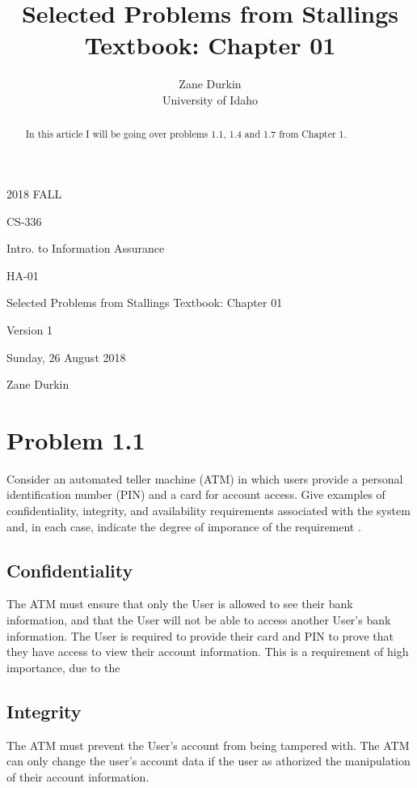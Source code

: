 \documentclass[14pt]{article}
\begin{document}
\title{Selected Problems from Stallings Textbook: Chapter 01}

\author{Zane Durkin\\
    University of Idaho}

\begin{description}[leftmargin=!, labelwidth=\widthof{\bfseries Author(s) Name(s)}]
\item [Year and Semester] 2018 FALL
\item [Course Number] CS-336
\item [Course Title] Intro. to Information Assurance
\item [Work Number] HA-01
\item [Work Name] Selected Problems from Stallings Textbook: Chapter 01
\item [Work Version] Version 1
\item [Long Date] Sunday, 26 August 2018
\item [Author(s) Name(s)] Zane Durkin
\end{description}


\begin{abstract}
In this article I will be going over problems 1.1, 1.4 and 1.7 from Chapter 1. 
\end{abstract}

\section{Problem 1.1}
Consider an automated teller machine (ATM) in which users provide a personal identification number (PIN) and a card for account access. Give examples of confidentiality, integrity, and availability requirements associated with the system and, in each case, indicate the degree of imporance of the requirement \cite{stallings}.
\subsection{Confidentiality}
The ATM must ensure that only the User is allowed to see their bank information, and that the User will not be able to access another User's bank information. The User is required to provide their card and PIN to prove that they have access to view their account information. This is a requirement of high importance, due to the 
\subsection{Integrity}
The ATM must prevent the User's account from being tampered with. The ATM can only change the user's account data if the user as athorized the manipulation of their account information.
\end{document}
